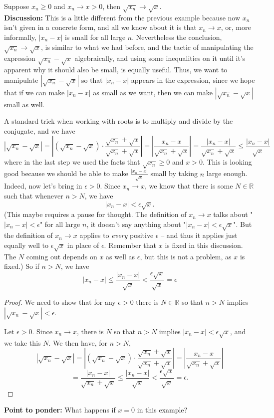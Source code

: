 \documentclass[11pt,dvipsnames]{book}
\def\R{\mathbb{R}}
\numberwithin{equation}{section} %
\numberwithin{figure}{section} %
\numberwithin{table}{section} %
\begin{document}
\begin{example}\label{sqrootxn}
Suppose $x_{n}\geq 0$ and $x_{n}\rightarrow x>0$, then $\sqrt{x_{n}}\rightarrow \sqrt{x}$. \\

{\bf Discussion:} This is a little different from the previous example because now $x_n$ isn't given in a concrete form, and all we know about it is that $x_n \rightarrow x$, or, more informally, $|x_n - x|$ is small for all large $n$. Nevertheless the conclusion, $\sqrt{x_{n}}\rightarrow \sqrt{x}$, is similar to what we had before, and the tactic of manipulating the expression $\sqrt{x_{n}}-\sqrt{x}$ algebraically, and using some inequalities on it until it's apparent why it should also be small, is equally useful. Thus, we want to manipulate $|\sqrt{x_{n}}-\sqrt{x}|$ so that $|x_{n}-x|$ appears in the expression, since we hope that if we can make $|x_{n}-x|$ as small as we want, then we can make $|\sqrt{x_{n}}-\sqrt{x}|$ small as well.

A standard trick when working with roots is to multiply and divide by the conjugate, and we have
\[
|\sqrt{x_{n}}-\sqrt{x}|
=\left|(\sqrt{x_{n}}-\sqrt{x})\cdot \frac{\sqrt{x_{n}}+\sqrt{x}}{\sqrt{x_{n}}+\sqrt{x}}\right|
=\left|\frac{x_{n}-x}{\sqrt{x_{n}}+\sqrt{x}}\right|
=\frac{|x_{n}-x|}{\sqrt{x_{n}}+\sqrt{x}} \leq \frac{|x_{n}-x|}{\sqrt{x}}
\]
where in the last step we used the facts that $\sqrt{x_n} \geq 0$ and $x > 0$. This is looking good because we should be able to make 
$\frac{|x_{n}-x|}{\sqrt{x}}$ small by taking $n$ large enough. Indeed, now let's bring in $\epsilon > 0$. Since $x_n \rightarrow x$, we know that there is some $N \in \mathbb{R}$ such that whenever $n > N$, 
we have 
\[ |x_n - x| <\epsilon\sqrt{x}.\]
(This maybe requires a pause for thought. The definition of $x_n \rightarrow x$ talks about "$|x_n - x| < \epsilon$" for all large $n$, it doesn't say anything about "$ |x_n - x| <\epsilon\sqrt{x}$". But the definition of $x_n \rightarrow x$ applies to {\em every} positive $\epsilon$ -- and thus it applies just equally well to $\epsilon\sqrt{x}$
in place of $\epsilon$. Remember that $x$ is fixed in this discussion. The $N$ coming out depends on $x$ as well as $\epsilon$, but this is not a problem, as $x$ is fixed.)
So if $n > N$, we have
\[|x_n - x| \leq \frac{|x_n - x|}{\sqrt{x}} < \frac{\epsilon\sqrt{x}}{\sqrt{x}} = \epsilon
\]

\begin{proof}
We need to show that for any $\epsilon>0$ there is $N \in \R$ so that $n> N$ implies $|\sqrt{x_{n}}-\sqrt{x}|<\epsilon$. 

Let $\epsilon>0$. Since $x_n\rightarrow x$, there is $N$ so that $n> N$ implies $|x_{n}-x|<\epsilon\sqrt{x}$, and we take this $N$. We then have, for $n > N$,
\[
|\sqrt{x_{n}}-\sqrt{x}|
=\left|(\sqrt{x_{n}}-\sqrt{x})\cdot \frac{\sqrt{x_{n}}+\sqrt{x}}{\sqrt{x_{n}}+\sqrt{x}}\right|
=\left|\frac{x_{n}-x}{\sqrt{x_{n}}+\sqrt{x}}\right|\]
\[=\frac{|x_{n}-x|}{\sqrt{x_{n}}+\sqrt{x}}
\leq \frac{|x_{n}-x|}{\sqrt{x}} 
< \frac{\epsilon \sqrt{x}}{\sqrt{x}} = \epsilon.
\]
\end{proof}
\end{example}
{\bf Point to ponder:} What happens if $x = 0$ in this example?
\end{document}
